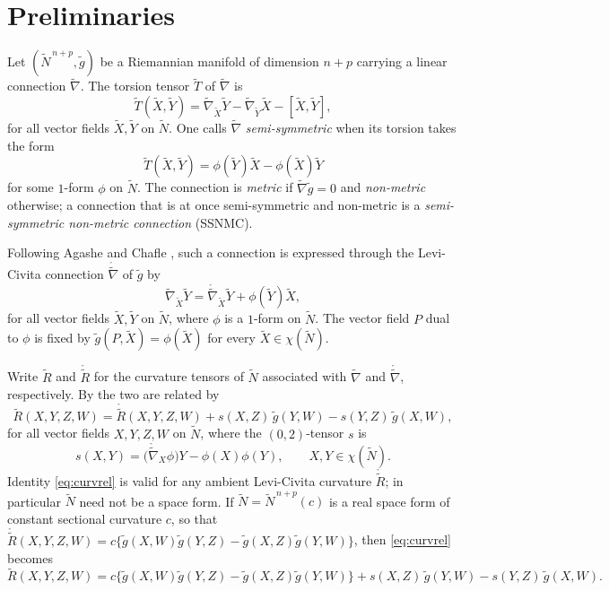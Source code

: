 \documentclass[11pt]{article}
\theoremstyle{definition}
\newcommand{\tN}{\widetilde{N}}
\newcommand{\tg}{\widetilde{g}}
\newcommand{\tnabla}{\widetilde{\nabla}}
\newcommand{\ctnabla}{\mathring{\widetilde{\nabla}}}
\newcommand{\tR}{\widetilde{R}}
\newcommand{\ctR}{\mathring{\widetilde{R}}}
\newcommand{\tT}{\widetilde{T}}
\newcommand{\tX}{\widetilde{X}}
\newcommand{\tY}{\widetilde{Y}}
\newcommand{\chr}{\chi}
\begin{document}
\section{Preliminaries}\label{sec:prelim}



Let $(\tN^{\,n+p},\tg)$ be a Riemannian manifold of dimension $n+p$ carrying a linear connection $\tnabla$. The torsion tensor $\tT$ of $\tnabla$ is
\begin{equation}\label{eq:torsion}
\tT(\tX,\tY)=\tnabla_{\tX}\tY-\tnabla_{\tY}\tX-[\tX,\tY],
\end{equation}
for all vector fields $\tX,\tY$ on $\tN$. One calls $\tnabla$ \emph{semi-symmetric} when its torsion takes the form
\begin{equation}\label{eq:ssdef}
\tT(\tX,\tY)=\phi(\tY)\tX-\phi(\tX)\tY
\end{equation}
for some $1$-form $\phi$ on $\tN$. The connection is \emph{metric} if $\tnabla\tg=0$ and \emph{non-metric} otherwise; a connection that is at once semi-symmetric and non-metric is a \emph{semi-symmetric non-metric connection} (SSNMC).

Following Agashe and Chafle \cite{AC1}, such a connection is expressed through the Levi-Civita connection $\ctnabla$ of $\tg$ by
\begin{equation}\label{eq:connform}
\tnabla_{\tX}\tY=\ctnabla_{\tX}\tY+\phi(\tY)\tX,
\end{equation}
for all vector fields $\tX,\tY$ on $\tN$, where $\phi$ is a $1$-form on $\tN$. The vector field $P$ dual to $\phi$ is fixed by $\tg(P,\tX)=\phi(\tX)$ for every $\tX\in\chr(\tN)$.

Write $\tR$ and $\ctR$ for the curvature tensors of $\tN$ associated with $\tnabla$ and $\ctnabla$, respectively. By \cite{AC1} the two are related by
\begin{equation}\label{eq:curvrel}
\tR(X,Y,Z,W)=\ctR(X,Y,Z,W)+s(X,Z)\,\tg(Y,W)-s(Y,Z)\,\tg(X,W),
\end{equation}
for all vector fields $X,Y,Z,W$ on $\tN$, where the $(0,2)$-tensor $s$ is
\begin{equation}\label{eq:sdef}
s(X,Y)=\bigl(\ctnabla_{X}\phi\bigr)Y-\phi(X)\phi(Y),\qquad X,Y\in\chr(\tN).
\end{equation}
Identity \eqref{eq:curvrel} is valid for any ambient Levi-Civita curvature $\ctR$; in particular $\tN$ need not be a space form. If $\tN=\tN^{\,n+p}(c)$ is a real space form of constant sectional curvature $c$, so that $\ctR(X,Y,Z,W)=c\{\tg(X,W)\tg(Y,Z)-\tg(X,Z)\tg(Y,W)\}$, then \eqref{eq:curvrel} becomes
\begin{equation}\label{eq:curvrel-sf}
\tR(X,Y,Z,W)=c\{\tg(X,W)\tg(Y,Z)-\tg(X,Z)\tg(Y,W)\}+s(X,Z)\,\tg(Y,W)-s(Y,Z)\,\tg(X,W).
\end{equation}
\end{document}
